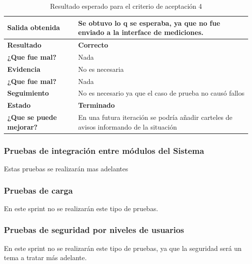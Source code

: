 \documentclass[a4paper,12pt]{article}
\begin{document}
{\scriptsize
	\begin{table}[h]

	\centering
	\begin{tabular}{|l|p{10cm}|}
	    \hline 
	    \textbf{Salida obtenida}&Se obtuvo lo q se esperaba, ya que no fue enviado a la interface de mediciones.\\ \hline
	    \textbf{Resultado}& \textbf{Correcto}\\ \hline
        \textbf{¿Que fue mal?}& Nada\\ \hline        
        \textbf{Evidencia}&No es necesaria  \\ \hline
        \textbf{¿Que fue mal?}& Nada\\ \hline      
        \textbf{Seguimiento}& No es necesario ya que el caso de prueba no causó fallos \\ \hline
        \textbf{Estado}& \textbf{Terminado}\\ \hline        
        \textbf{¿Que se puede mejorar?}& En una futura iteración se podría añadir carteles de avisos informando de la situación\\ \hline              
	    \end{tabular}
        \caption{Resultado esperado para el criterio de aceptación 4}
   	\end{table}
	}


\clearpage
\subsubsection{Pruebas  de  integración  entre módulos del Sistema}
Estas pruebas se realizarán mas adelantes
\subsubsection{ Pruebas de carga}
En este sprint no se realizarán este tipo de pruebas.
\subsubsection{ Pruebas de seguridad por niveles de usuarios}
En este sprint no se realizarán este tipo de pruebas, ya que la seguridad será un tema a tratar más adelante.
\end{document}

